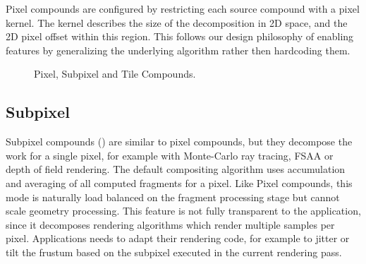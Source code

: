 Pixel compounds are configured by restricting each source compound with a pixel
kernel. The kernel describes the size of the decomposition in 2D space, and the
2D pixel offset within this region. This follows our design philosophy of
enabling features by generalizing the underlying algorithm rather then
hardcoding them.

\begin{figure}[t]\center
  \hfil
  \hfil
  \caption{Pixel, Subpixel and Tile Compounds.}
\end{figure}

\subsection{Subpixel}

Subpixel compounds () are similar to pixel compounds, but they
decompose the work for a single pixel, for example with Monte-Carlo ray
tracing, FSAA or depth of field rendering. The default compositing algorithm
uses accumulation and averaging of all computed fragments for a pixel. Like
Pixel compounds, this mode is naturally load balanced on the fragment
processing stage but cannot scale geometry processing. This feature is not
fully transparent to the application, since it decomposes rendering algorithms
which render multiple samples per pixel. Applications needs to adapt their
rendering code, for example to jitter or tilt the frustum based on the subpixel
executed in the current rendering pass.

